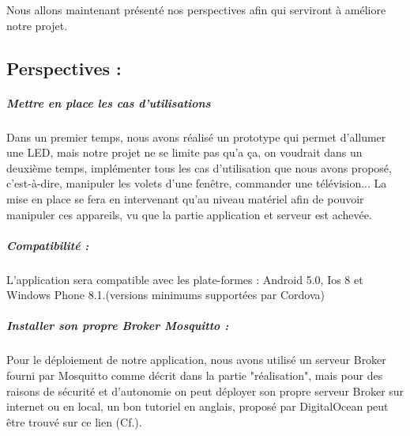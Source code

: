 \documentclass[12pt,a4paper]{article}
\begin{document}
Nous allons maintenant présenté nos perspectives afin qui serviront à améliore notre projet.\par

\subsection*{Perspectives :}

\subparagraph{Mettre en place les cas d'utilisations}
Dans un premier temps, nous avons réalisé un prototype qui permet d'allumer une LED, mais notre projet ne se limite pas qu'a ça, on voudrait dans un deuxième temps, implémenter tous les cas d'utilisation que nous avons proposé, c'est-à-dire, manipuler les volets d'une fenêtre, commander une télévision... La mise en place se fera en intervenant qu'au niveau matériel  afin de pouvoir manipuler ces appareils, vu que la partie application et serveur est achevée.

\subparagraph{Compatibilité :} L'application sera compatible avec les plate-formes : Android 5.0, Ios 8 et Windows Phone 8.1.(versions minimums supportées par Cordova)\par

\subparagraph{Installer son propre Broker Mosquitto :}
Pour le déploiement de notre application, nous avons utilisé un serveur Broker fourni par Mosquitto comme décrit dans la partie "réalisation", mais pour des raisons de sécurité et d'autonomie on peut déployer son propre serveur Broker sur internet ou en local, un bon tutoriel en anglais, proposé par DigitalOcean peut être trouvé sur ce lien (Cf.\cite{Ref31}).\par
\end{document}
